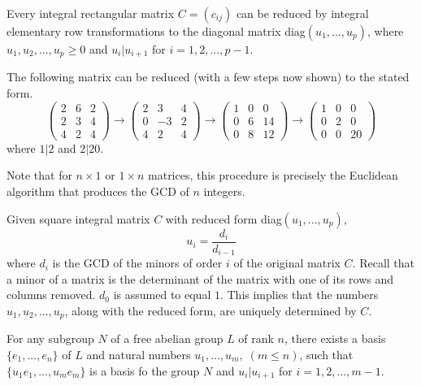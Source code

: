 \documentclass{article}
\begin{document}
  \begin{proposition}
    Every integral rectangular matrix $C = (c_{i j})$ can be reduced by integral elementary row transformations to the diagonal matrix diag$(u_1, ..., u_p)$, where $u_1, u_2, ..., u_p \geq 0$ and $u_i | u_{i+1}$ for $i = 1, 2, ..., p -1$. 
  \end{proposition}

  \begin{example}
    The following matrix can be reduced (with a few steps now shown) to the stated form. 
    \[\begin{pmatrix} 2&6&2 \\ 2&3&4 \\ 4&2&4 \end{pmatrix} \rightarrow 
    \begin{pmatrix} 2&3&4 \\ 0&-3&2 \\ 4&2&4 \end{pmatrix} \rightarrow
    \begin{pmatrix} 1&0&0 \\ 0&6&14 \\ 0&8&12 \end{pmatrix} \rightarrow
    \begin{pmatrix} 1&0&0 \\ 0&2&0 \\ 0&0&20\end{pmatrix}
    \]
    where $1|2$ and $2|20$. 
  \end{example}

  Note that for $n \times 1$ or $1 \times n$ matrices, this procedure is precisely the Euclidean algorithm that produces the GCD of $n$ integers. 

  \begin{proposition}
    Given square integral matrix $C$ with  reduced form diag$(u_1, ..., u_p)$, 
    \begin{equation}
      u_i = \frac{d_i}{d_{i-1}}
    \end{equation}
    where $d_i$ is the GCD of the minors of order $i$ of the original matrix $C$. Recall that a minor of a matrix is the determinant of the matrix with one of its rows and columns removed. $d_0$ is assumed to equal $1$. This implies that the numbers $u_1, u_2, ..., u_p$, along with the reduced form, are uniquely determined by $C$. 
  \end{proposition}

  \begin{theorem}
    For any subgroup $N$ of a free abelian group $L$ of rank $n$, there exists a basis $\{e_1, ..., e_n\}$ of $L$ and natural numbers $u_1, ..., u_m, \; (m \leq n)$, such that $\{u_1 e_1, ..., u_m e_m\}$ is a basis fo the group $N$ and $u_i | u_{i+1}$ for $i = 1, 2, ..., m-1$. 
  \end{theorem}
\end{document}
